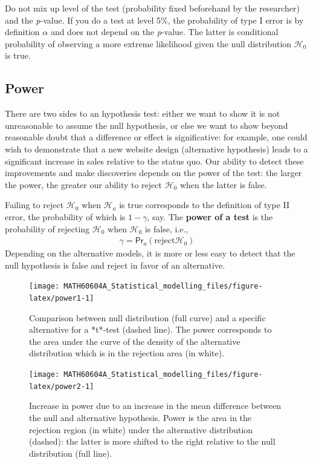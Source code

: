 \documentclass[
  11pt,
  letterpaper,
]{book}
\theoremstyle{definition}
\theoremstyle{definition}
\theoremstyle{definition}
\theoremstyle{remark}
\begin{document}
Do not mix up level of the test (probability fixed beforehand by the researcher) and the \emph{p}-value. If you do a test at level 5\%, the probability of type I error is by definition \(\alpha\) and does not depend on the \emph{p}-value. The latter is conditional probability of observing a more extreme likelihood given the null distribution \(\mathscr{H}_0\) is true.

\hypertarget{power}{%
\subsection{Power}\label{power}}

There are two sides to an hypothesis test: either we want to show it is not unreasonable to assume the null hypothesis, or else we want to show beyond reasonable doubt that a difference or effect is significative: for example, one could wish to demonstrate that a new website design (alternative hypothesis) leads to a significant increase in sales relative to the status quo. Our ability to detect these improvements and make discoveries depends on the power of the test: the larger the power, the greater our ability to reject \(\mathscr{H}_0\) when the latter is false.

Failing to reject \(\mathscr{H}_0\) when \(\mathscr{H}_a\) is true corresponds to the definition of type II error, the probability of which is \(1-\gamma\), say. The \textbf{power of a test} is the probability of rejecting \(\mathscr{H}_0\) when \(\mathscr{H}_0\) is false, i.e.,
\begin{align*}
\gamma = \mathsf{Pr}_a(\text{reject} \mathscr{H}_0)
\end{align*}
Depending on the alternative models, it is more or less easy to detect that the null hypothesis is false and reject in favor of an alternative.

\begin{figure}

{\centering \texttt{[image: MATH60604A\_Statistical\_modelling\_files/figure-latex/power1-1]} 

}

\caption{Comparison between null distribution (full curve) and a specific alternative for a *t*-test (dashed line). The power corresponds to the area under the curve of the density of the alternative distribution which is in the rejection area (in white).}\label{fig:power1}
\end{figure}

\begin{figure}

{\centering \texttt{[image: MATH60604A\_Statistical\_modelling\_files/figure-latex/power2-1]} 

}

\caption{Increase in power due to an increase in the mean difference between the null and alternative hypothesis. Power is the area in the rejection region (in white) under the alternative distribution (dashed): the latter is more shifted to the right relative to the null distribution (full line).}\label{fig:power2}
\end{figure}
\end{document}

